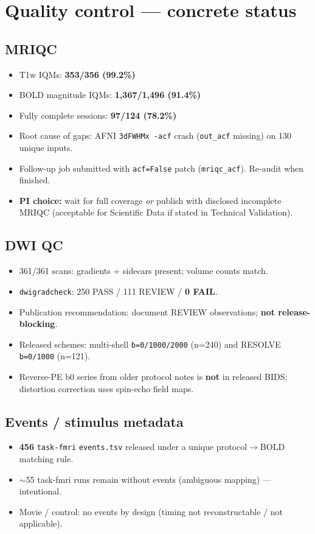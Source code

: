 \documentclass[11pt,a4paper]{article}
\begin{document}
\section{Quality control --- concrete status}

\subsection{MRIQC}
\begin{itemize}[leftmargin=1.2em,itemsep=1pt]
\item T1w IQMs: \textbf{353/356 (99.2\%)}
\item BOLD magnitude IQMs: \textbf{1{,}367/1{,}496 (91.4\%)}
\item Fully complete sessions: \textbf{97/124 (78.2\%)}
\item Root cause of gaps: AFNI \texttt{3dFWHMx -acf} crash (\texttt{out\_acf} missing) on 130 unique inputs.
\item Follow-up job submitted with \texttt{acf=False} patch (\texttt{mriqc\_acf}). Re-audit when finished.
\item \textbf{PI choice:} wait for full coverage \emph{or} publish with disclosed incomplete MRIQC (acceptable for Scientific Data if stated in Technical Validation).
\end{itemize}

\subsection{DWI QC}
\begin{itemize}[leftmargin=1.2em,itemsep=1pt]
\item 361/361 scans: gradients + sidecars present; volume counts match.
\item \texttt{dwigradcheck}: 250 PASS / 111 REVIEW / \textbf{0 FAIL}.
\item Publication recommendation: document REVIEW observations; \textbf{not release-blocking}.
\item Released schemes: multi-shell \texttt{b=0/1000/2000} (n=240) and RESOLVE \texttt{b=0/1000} (n=121).
\item Reverse-PE b0 series from older protocol notes is \textbf{not} in released BIDS; distortion correction uses spin-echo field maps.
\end{itemize}

\subsection{Events / stimulus metadata}
\begin{itemize}[leftmargin=1.2em,itemsep=1pt]
\item \textbf{456} \texttt{task-fmri} \texttt{events.tsv} released under a unique protocol$\rightarrow$BOLD matching rule.
\item $\sim$55 task-fmri runs remain without events (ambiguous mapping) --- intentional.
\item Movie / control: no events by design (timing not reconstructable / not applicable).
\end{itemize}
\end{document}
